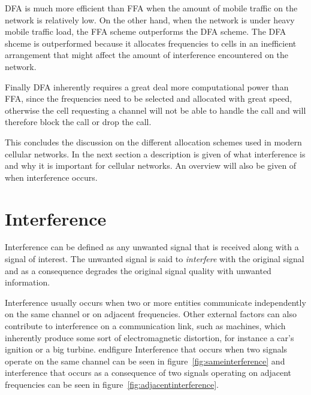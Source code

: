 \gls{DFA} is much more efficient than \gls{FFA} when the amount of mobile traffic on the network is relatively low\cite{PrinciplesMobileCommunication,WirelessCommunications}. On the other hand, when the network is under heavy mobile traffic load, the \gls{FFA} scheme outperforms the \gls{DFA} scheme\cite{WirelessCommunications}. The \gls{DFA} shceme is outperformed because it allocates frequencies to cells in an inefficient arrangement that might affect the amount of interference encountered on the network\cite{MobileWirelessCommunications}.

Finally \gls{DFA} inherently requires a great deal more computational power than \gls{FFA}, since the frequencies need to be selected and allocated with great speed, otherwise the cell requesting a channel will not be able to handle the call and will therefore block the call or drop the call\cite{PrinciplesMobileCommunication,WirelessCommunications,MobileWirelessCommunications}.


This concludes the discussion on the different allocation schemes used in modern cellular networks. In the next section a description is given of what interference is and why it is important for cellular networks. An overview will also be given of when interference occurs.

\section{Interference}
\label{sec:Interference}
Interference can be defined as any unwanted signal that is received along with a signal of interest\cite{WirelessDigitalCommunications}. The unwanted signal is said to \emph{interfere} with the original signal and as a consequence degrades the original signal quality with unwanted information\cite{WirelessDigitalCommunications}.

Interference usually occurs when two or more entities communicate independently on the same channel or on adjacent frequencies\cite{WirelessCommunications,WirelessDigitalCommunications}. Other external factors can also contribute to interference on a communication link, such as machines, which inherently produce some sort of electromagnetic distortion, for instance a car's ignition or a big turbine\cite{WirelessCommunications,WirelessDigitalCommunications}. 
end{figure}
Interference that occurs when two signals operate on the same channel can be seen in figure~\ref{fig:sameinterference} and interference that occurs as a consequence of two signals operating on adjacent frequencies can be seen in figure~\ref{fig:adjacentinterference}.

